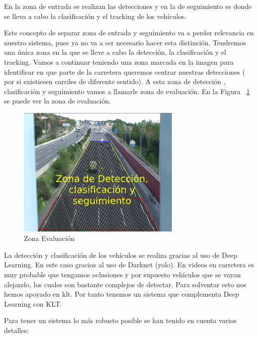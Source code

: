 En la zona de entrada se realizan las detecciones y en la de seguimiento es donde se lleva a cabo la clasificación y el tracking de los vehículos.

Este concepto de separar zona de entrada y seguimiento va a perder relevancia en nuestro sistema, pues ya no va a ser necesario hacer esta distinción. Tendremos una única zona en la que se lleve a cabo la detección, la clasificación y el tracking. Vamos a continuar teniendo una zona marcada en la imagen para identificar en que parte de la carretera queremos centrar nuestras detecciones ( por si existiesen carriles de diferente sentido). A esta zona de detección , clasificación y seguimiento vamos a llamarle zona de evaluación. En la Figura ~\ref{fig.nueva_zona} se puede ver la zona  de evaluación.

\begin{figure}
\begin{center}
	\includegraphics[width=0.7\textwidth]{figures/Diseno_global/nueva_zona.png}
   \caption{Zona Evaluación}
	\label{fig.nueva_zona}
\end{center}
\end{figure}

La detección y clasificación de los vehículos se realiza gracias al uso de Deep Learning. En este caso gracias al uso de Darknet (\acrshort{yolo}). En videos en carretera es muy probable que tengamos oclusiones y por supuesto vehículos que se vayan alejando, los cuales son bastante complejos de detectar. Para solventar esto nos hemos apoyado en \acrshort{klt}. Por tanto tenemos un sistema que complementa Deep Learning con KLT. 

Para tener un sistema lo más robusto posible se han tenido en cuenta varios detalles:

